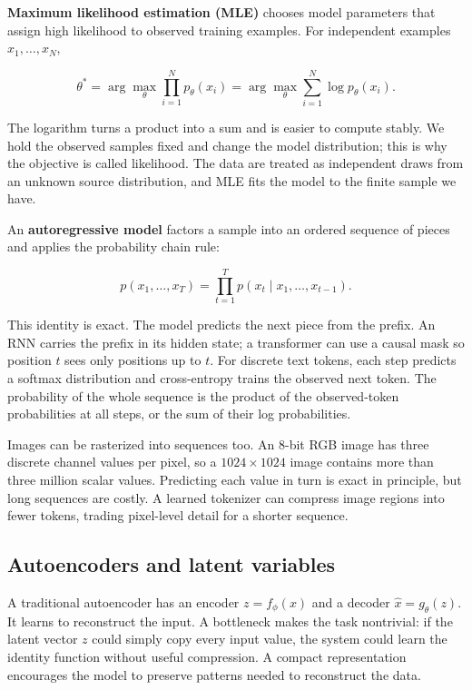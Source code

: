 \hypertarget{04-visual-computing-ii-ch031-likelihood-and-autoregressive-factorization}{}

\textbf{Maximum likelihood estimation (MLE)} chooses model parameters that assign high likelihood to observed training examples. For independent examples \(x_1,\ldots,x_N\),

\[
\theta^*=\arg\max_\theta \prod_{i=1}^{N}p_\theta(x_i)
=\arg\max_\theta \sum_{i=1}^{N}\log p_\theta(x_i).
\]

The logarithm turns a product into a sum and is easier to compute stably. We hold the observed samples fixed and change the model distribution; this is why the objective is called likelihood. The data are treated as independent draws from an unknown source distribution, and MLE fits the model to the finite sample we have.

An \textbf{autoregressive model} factors a sample into an ordered sequence of pieces and applies the probability chain rule:

\[
p(x_1,\ldots,x_T)=\prod_{t=1}^{T}p(x_t\mid x_1,\ldots,x_{t-1}).
\]

This identity is exact. The model predicts the next piece from the prefix. An RNN carries the prefix in its hidden state; a transformer can use a causal mask so position \(t\) sees only positions up to \(t\). For discrete text tokens, each step predicts a softmax distribution and cross-entropy trains the observed next token. The probability of the whole sequence is the product of the observed-token probabilities at all steps, or the sum of their log probabilities.

Images can be rasterized into sequences too. An 8-bit RGB image has three discrete channel values per pixel, so a \(1024\times1024\) image contains more than three million scalar values. Predicting each value in turn is exact in principle, but long sequences are costly. A learned tokenizer can compress image regions into fewer tokens, trading pixel-level detail for a shorter sequence.

\subsection{Autoencoders and latent variables}\label{04-visual-computing-ii-ch031-autoencoders-and-latent-variables}

\hypertarget{04-visual-computing-ii-ch031-autoencoders-and-latent-variables}{}

A traditional autoencoder has an encoder \(z=f_\phi(x)\) and a decoder \(\hat{x}=g_\theta(z)\). It learns to reconstruct the input. A bottleneck makes the task nontrivial: if the latent vector \(z\) could simply copy every input value, the system could learn the identity function without useful compression. A compact representation encourages the model to preserve patterns needed to reconstruct the data.

